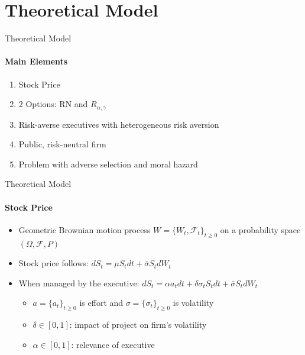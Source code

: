 \documentclass{beamer}
\begin{document}
\section{Theoretical Model}
\begin{frame}{Theoretical Model}
    \framesubtitle{Main Elements}
    \begin{enumerate}
        \item Stock Price
        \item 2 Options: RN and $R_{\alpha, \gamma}$
        \item Risk-averse executives with heterogeneous risk aversion
        \item Public, risk-neutral firm
        \item Problem with adverse selection and moral hazard
    \end{enumerate}
\end{frame}

\begin{frame}{Theoretical Model}
    \framesubtitle{Stock Price}
    \begin{itemize}
        \item Geometric Brownian motion process $W = \{ W_t, \mathscr{F}_t \}_{t \ge 0}$ on a probability space $(\Omega, \mathscr{F}, P)$
        \item Stock price follows: $dS_t = \mu S_t dt + \bar{\sigma} S_t dW_t$
        \vspace*{5pt}
        \item When managed by the executive: $dS_t = \alpha a_t dt + \delta \sigma_t S_t dt + \bar{\sigma} S_t dW_t$
        \begin{itemize}
            \item $a = \{a_t\}_{t \ge 0}$ is effort and $\sigma = \{\sigma_t\}_{t \ge 0}$ is volatility
            \item $\delta \in [0,1]$: impact of project on firm's volatility
            \item $\alpha \in [0,1]$: relevance of executive
        \end{itemize}
    \end{itemize}
\end{frame}
\end{document}
